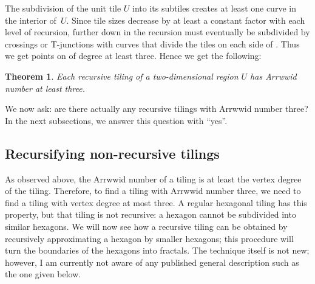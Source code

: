\documentclass[11pt,a4paper]{article}
\newcommand{\unittile}{\ensuremath{U}\xspace}
\newtheorem{theorem}{Theorem}
\begin{document}
The subdivision of the unit tile \unittile into its subtiles creates at least one curve  in the interior of~\unittile. Since tile sizes decrease by at least a constant factor with each level of recursion, further down in the recursion  must eventually be subdivided by crossings or T-junctions with curves that divide the tiles on each side of . Thus we get points on  of degree at least three. Hence we get the following:

\begin{theorem}\label{th:2dtilinglb}
Each recursive tiling of a two-dimensional region \unittile has Arrwwid number at least three.
\end{theorem}

We now ask: are there actually any recursive tilings with Arrwwid number three? In the next subsections, we answer this question with ``yes''.

\subsection{Recursifying non-recursive tilings}
As observed above, the Arrwwid number of a tiling is at least the vertex degree of the tiling. Therefore, to find a tiling with Arrwwid number three, we need to find a tiling with vertex degree at most three. A regular hexagonal tiling has this property, but that tiling is not recursive: a hexagon cannot be subdivided into similar hexagons. We will now see how a recursive tiling can be obtained by recursively approximating a hexagon by smaller hexagons; this procedure will turn the boundaries of the hexagons into fractals. The technique itself is not new; however, I am currently not aware of any published general description such as the one given below.
\end{document}

